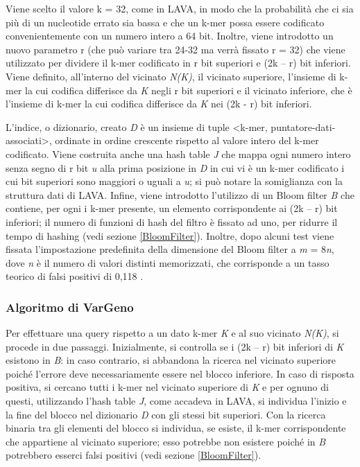 \documentclass[../main.tex]{subfiles}
\begin{document}
Viene scelto il valore k = 32, come in LAVA, in modo che la probabilità che ci sia più di un nucleotide errato sia bassa e che un k-mer possa essere codificato convenientemente con un numero intero a 64 bit. Inoltre, viene introdotto un nuovo parametro r (che può variare tra 24-32 ma verrà fissato r = 32) che viene utilizzato per dividere il k-mer codificato in r bit superiori e (2k – r) bit inferiori. Viene definito, all'interno del vicinato \textit{N(K)}, il vicinato superiore, l'insieme di k-mer la cui codifica differisce da \textit{K} negli r bit superiori e il vicinato inferiore, che è l'insieme di k-mer la cui codifica differisce da \textit{K} nei (2k - r) bit inferiori.

L’indice, o dizionario, creato \textit{D} è un insieme di tuple <k-mer, puntatore-dati-associati>, ordinate in ordine crescente rispetto al valore intero del k-mer codificato. Viene costruita anche una hash table \textit{J} che mappa ogni numero intero senza segno di r bit \textit{u} alla prima posizione in \textit{D} in cui vi è un k-mer codificato i cui bit superiori sono maggiori o uguali a \textit{u}; si può notare la somiglianza con la struttura dati di LAVA. Infine, viene introdotto l'utilizzo di un Bloom filter \textit{B} che contiene, per ogni i k-mer presente, un elemento corrispondente ai (2k – r) bit inferiori; il numero di funzioni di hash del filtro è fissato ad uno, per ridurre il tempo di hashing (vedi sezione \ref{BloomFilter}). Inoltre, dopo alcuni test viene fissata l'impostazione predefinita della dimensione del Bloom filter a \textit{m} = 8\textit{n}, dove \textit{n} è il numero di valori distinti memorizzati, che corrisponde a un tasso teorico di falsi positivi di 0,118 \cite{sun-medvedev2018vargeno}.

\subsubsection{Algoritmo di VarGeno}

Per effettuare una query rispetto a un dato k-mer \textit{K} e al suo vicinato \textit{N(K)}, si procede in due passaggi. Inizialmente, si controlla se i (2k – r) bit inferiori di \textit{K} esistono in \textit{B}: in caso contrario, si abbandona la ricerca nel vicinato superiore poiché l'errore deve necessariamente essere nel blocco inferiore. In caso di risposta positiva, si cercano tutti i k-mer nel vicinato superiore di \textit{K} e per ognuno di questi, utilizzando l'hash table \textit{J}, come accadeva in LAVA, si individua l'inizio e la fine del blocco nel dizionario \textit{D} con gli stessi bit superiori. Con la ricerca binaria tra gli elementi del blocco si individua, se esiste, il k-mer corrispondente che appartiene al vicinato superiore; esso potrebbe non esistere poiché in \textit{B} potrebbero esserci falsi positivi (vedi sezione \ref{BloomFilter}).
\end{document}
